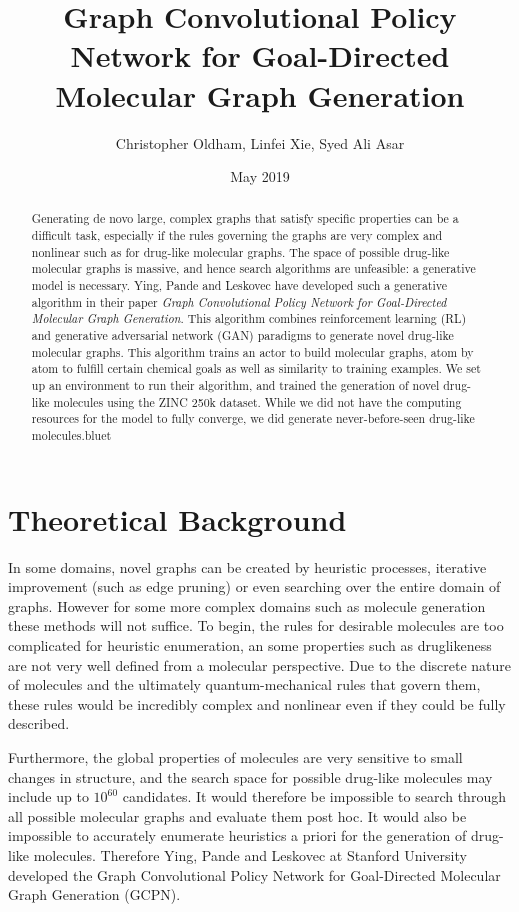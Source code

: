 \documentclass{article}
\title{Graph Convolutional Policy Network for Goal-Directed Molecular Graph Generation}
\author{Christopher Oldham, Linfei Xie, Syed Ali Asar }
\date{May 2019}
\begin{document}
\maketitle

\begin{abstract}
    Generating de novo large, complex graphs that satisfy specific properties can be a difficult task, especially if the rules governing the graphs are very complex and nonlinear such as for drug-like molecular graphs. The space of possible drug-like molecular graphs is massive, and hence search algorithms are unfeasible: a generative model is necessary. Ying, Pande and Leskovec have developed such a generative algorithm in their paper \textit{Graph Convolutional Policy Network for Goal-Directed Molecular Graph Generation}. This algorithm combines reinforcement learning (RL) and generative adversarial network (GAN) paradigms to generate novel drug-like molecular graphs. This algorithm trains an actor to build molecular graphs, atom by atom to fulfill certain chemical goals as well as similarity to training examples. We set up an environment to run their algorithm, and trained the generation of novel drug-like molecules using the ZINC 250k dataset. While we did not have the computing resources for the model to fully converge, we did generate never-before-seen drug-like molecules.bluet
\end{abstract}

\section{Theoretical Background}
In some domains, novel graphs can be created by heuristic processes, iterative improvement (such as edge pruning) or even searching over the entire domain of graphs. However for some more complex domains such as molecule generation these methods will not suffice. To begin, the rules for desirable molecules are too complicated for heuristic enumeration, an some properties such as druglikeness are not very well defined from a molecular perspective. Due to the discrete nature of molecules and the ultimately quantum-mechanical rules that govern them, these rules would be incredibly complex and nonlinear even if they could be fully described.

Furthermore, the global properties of molecules are very sensitive to small changes in structure, and the search space for possible drug-like molecules may include up to $10^{60}$ candidates. It would therefore be impossible to search through all possible molecular graphs and evaluate them post hoc. It would also be impossible to accurately enumerate heuristics a priori for the generation of drug-like molecules. Therefore Ying, Pande and Leskovec at Stanford University developed the Graph Convolutional Policy Network for Goal-Directed Molecular Graph Generation (GCPN).
\end{document}
